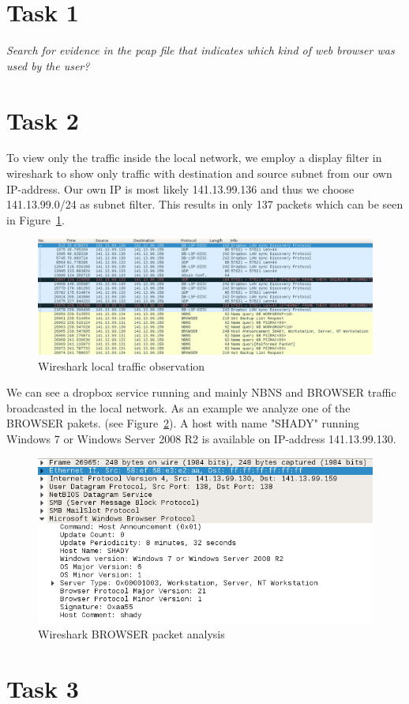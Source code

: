\documentclass[12pt]{article}
\begin{document}
\maketitle


\section{Task 1}\label{task1}
\emph{Search for evidence in the pcap file that indicates which kind of web browser was
used by the user?}


\section{Task 2}\label{task2}
To view only the traffic inside the local network, we employ a display filter in wireshark to show only traffic with destination and source subnet from our own IP-address. Our own IP is most likely 141.13.99.136 and thus we choose 141.13.99.0/24 as subnet filter. This results in only 137 packets which can be seen in Figure~\ref{img_wireshark_overview}.

\begin{figure}[h]%
\centering%
\includegraphics[width=\textwidth]{images/wireshark_overview.png}%
\caption{Wireshark local traffic observation}%
\label{img_wireshark_overview}%
\end{figure}%


We can see a dropbox service running and mainly NBNS and BROWSER traffic broadcasted in the local network. As an example we analyze one of the BROWSER pakets. (see Figure~\ref{img_wireshark_browser}).
A host with name "SHADY" running Windows 7 or Windows Server 2008 R2 is available on IP-address 141.13.99.130.

\begin{figure}[h]%
\centering%
\includegraphics[width=\textwidth]{images/wireshark_browser.png}%
\caption{Wireshark BROWSER packet analysis}%
\label{img_wireshark_browser}%
\end{figure}%


\section{Task 3}\label{task3}
\end{document}
